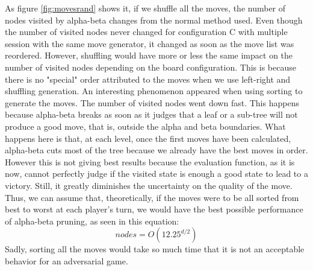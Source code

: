 \documentclass{article}
\begin{document}
As figure \ref{fig:movesrand} shows it, if we shuffle all the moves, the number of nodes visited by alpha-beta changes from the normal method used. Even though the number of visited nodes never changed for configuration C with multiple session with the same move generator, it changed as soon as the move list was reordered. However, shuffling would have more or less the same impact on the number of visited nodes depending on the board configuration. This is because there is no "special" order attributed to the moves when we use left-right and shuffling generation. An interesting phenomenon appeared when using sorting to generate the moves. The number of visited nodes went down fast. This happens because alpha-beta breaks as soon as it judges that a leaf or a sub-tree will not produce a good move, that is, outside the alpha and beta boundaries. What happens here is that, at each level, once the first moves have been calculated, alpha-beta cuts most of the tree because we already have the best moves in order. However this is not giving best results because the evaluation function, as it is now, cannot perfectly judge if the visited state is enough a good state to lead to a victory. Still, it greatly diminishes the uncertainty on the quality of the move. Thus, we can assume that, theoretically, if the moves were to be all sorted from best to worst at each player's turn, we would have the best possible performance of alpha-beta pruning, as seen in this equation: \[nodes = O(12.25^{d/2}) \] 
Sadly, sorting all the moves would take so much time that it is not an acceptable behavior for an adversarial game.
	
 
\end{document}
